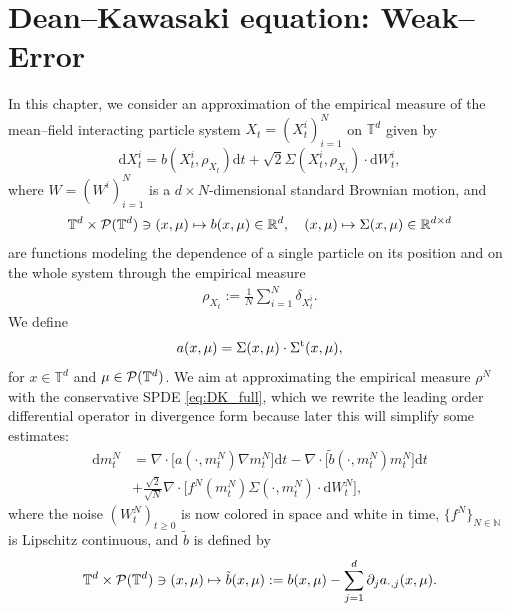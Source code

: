 \chapter{Dean--Kawasaki equation: Weak--Error}\label{ch:weak}
In this chapter, we consider an approximation of the empirical measure of the mean--field interacting particle system $X_t = (X_t^i)_{i=1}^N$ on $\mathbb{T}^d$ given by
\begin{equation}\label{eq:main_particle}
\mathrm{d}X^i_t = b(X_t^i, {\rho}_{X_t})\mathrm{d}t +\sqrt{2}\Sigma(X_t^i, {\rho}_{X_t})\cdot \mathrm{d}W^i_t, 
\end{equation}
where $W = (W^i)_{i=1}^N$ is a $d \times N$-dimensional standard Brownian motion, and 
\[
\mathbb{T}^d \times \mathcal{P}(\mathbb{T}^d) \ni (x, \mu) \mapsto b(x,\mu) \in \mathbb{R}^d, \quad (x, \mu) \mapsto \Sigma(x,\mu) \in \mathbb{R}^{d\times d}
\]
are functions modeling the dependence of a single particle on its position and on the whole system through the empirical measure
\begin{align}\label{eq:empirical}
   \rho_{X_t} := \frac{1}{N}\sum_{i = 1}^N \delta_{X_t^i}.
\end{align}
We define
\begin{equation}\label{eq:def_a}
    a(x,\mu) = \Sigma(x,\mu)\cdot\Sigma^{\operatorname{t}}(x,\mu), 
\end{equation}
for $x \in \mathbb{T}^d$ and $\mu \in \mathcal{P}(\mathbb{T}^d)$. We aim at approximating the empirical measure $\rho^N$ with the conservative SPDE \eqref{eq:DK_full}, which we rewrite the leading order differential operator in divergence form because later this will simplify some estimates:
\begin{equation}\label{eq:DK_reg}
\begin{split}
    \mathrm{d}m^N_t & = \nabla \cdot \big[a(\cdot, m^N_t) \nabla m^N_t\big]\mathrm{d}t - \nabla \cdot \big[\tilde{b}(\cdot, m^N_t)m^N_t \big]\mathrm{d}t\\
    & + \frac{\sqrt{2}}{\sqrt{N}}\nabla \cdot \big[f^N(m^N_t) \Sigma (\cdot, m^N_t) \cdot \mathrm{d}W^N_t\big],
\end{split}
\end{equation}
where the noise $(W^N_t)_{t \geq 0}$ is now colored in space and white in time, $\{f^N\}_{N \in \mathbb{N}}$ is Lipschitz continuous, and $\tilde b$ is defined by
\begin{equation}\label{eq:modified_drift}
\mathbb{T}^d \times \mathcal{P}(\mathbb{T}^d) \ni (x,\mu) \mapsto \tilde{b}(x,\mu) := b(x,\mu) - \sum_{j=1}^d \partial_j a_{\cdot, j}(x,\mu).
\end{equation}

